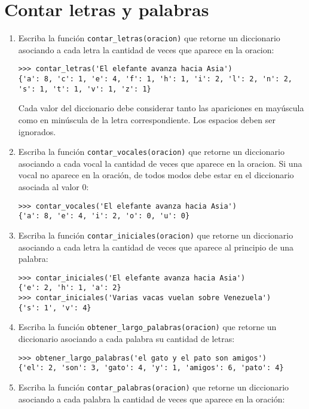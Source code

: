 \section{Contar letras y palabras}

\begin{enumerate}
\item
  Escriba la función \lstinline!contar_letras(oracion)! que retorne un
  diccionario asociando a cada letra la cantidad de veces que aparece en
  la oracion:

\begin{lstlisting}
>>> contar_letras('El elefante avanza hacia Asia')
{'a': 8, 'c': 1, 'e': 4, 'f': 1, 'h': 1, 'i': 2, 'l': 2, 'n': 2, 's': 1, 't': 1, 'v': 1, 'z': 1}
\end{lstlisting}

  Cada valor del diccionario debe considerar tanto las apariciones en
  mayúscula como en minúscula de la letra correspondiente. Los espacios
  deben ser ignorados.
\item
  Escriba la función \lstinline!contar_vocales(oracion)! que retorne un
  diccionario asociando a cada vocal la cantidad de veces que aparece en
  la oracion. Si una vocal no aparece en la oración, de todos modos debe
  estar en el diccionario asociada al valor 0:

\begin{lstlisting}
>>> contar_vocales('El elefante avanza hacia Asia')
{'a': 8, 'e': 4, 'i': 2, 'o': 0, 'u': 0}
\end{lstlisting}
\item
  Escriba la función \lstinline!contar_iniciales(oracion)! que retorne
  un diccionario asociando a cada letra la cantidad de veces que aparece
  al principio de una palabra:

\begin{lstlisting}
>>> contar_iniciales('El elefante avanza hacia Asia')
{'e': 2, 'h': 1, 'a': 2}
>>> contar_iniciales('Varias vacas vuelan sobre Venezuela')
{'s': 1', 'v': 4}
\end{lstlisting}
\item
  Escriba la función \lstinline!obtener_largo_palabras(oracion)! que
  retorne un diccionario asociando a cada palabra su cantidad de letras:

\begin{lstlisting}
>>> obtener_largo_palabras('el gato y el pato son amigos')
{'el': 2, 'son': 3, 'gato': 4, 'y': 1, 'amigos': 6, 'pato': 4}
\end{lstlisting}
\item
  Escriba la función \lstinline!contar_palabras(oracion)! que retorne un
  diccionario asociando a cada palabra la cantidad de veces que aparece
  en la oración:


\end{enumerate}
